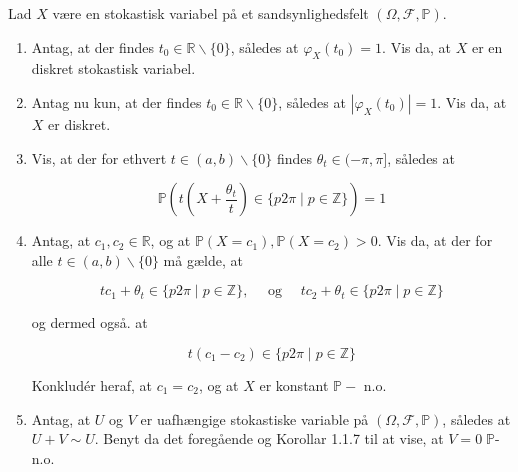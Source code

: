 \documentclass{Class}
\newcommand{\1}{\mathbbm{1}}
\theoremstyle{boxed}
\begin{document}
Lad $X$ være en stokastisk variabel på et sandsynlighedsfelt $(\Omega, \mathcal{F}, \mathbb{P})$.
\begin{enumerate}
  \item Antag, at der findes $t_0 \in \mathbb{R} \backslash\{0\}$, således at $\varphi_X\left(t_0\right)=1$. Vis da, at $X$ er en diskret stokastisk variabel.
  \item  Antag nu kun, at der findes $t_0 \in \mathbb{R} \backslash\{0\}$, således at $\left|\varphi_X\left(t_0\right)\right|=1$. Vis da, at $X$ er diskret.
  \item Vis, at der for ethvert $t \in(a, b) \backslash\{0\}$ findes $\theta_t \in(-\pi, \pi]$, således at

  $$
  \mathbb{P}\left(t\left(X+\frac{\theta_t}{t}\right) \in\{p 2 \pi \mid p \in \mathbb{Z}\}\right)=1
  $$
  \item Antag, at $c_1, c_2 \in \mathbb{R}$, og at $\mathbb{P}\left(X=c_1\right), \mathbb{P}\left(X=c_2\right)>0$. Vis da, at der for alle $t \in(a, b) \backslash\{0\}$ må gælde, at

  $$
  t c_1+\theta_t \in\{p 2 \pi \mid p \in \mathbb{Z}\}, \quad \text { og } \quad t c_2+\theta_t \in\{p 2 \pi \mid p \in \mathbb{Z}\}
  $$
  
  og dermed også. at
  
  $$
  t\left(c_1-c_2\right) \in\{p 2 \pi \mid p \in \mathbb{Z}\}
  $$
  
  
  Konkludér heraf, at $c_1=c_2$, og at $X$ er konstant $\mathbb{P}-$ n.o.
  \item Antag, at $U$ og $V$ er uafhængige stokastiske variable på $(\Omega, \mathcal{F}, \mathbb{P})$, således at $U+V \sim U$. Benyt da det foregående og Korollar 1.1.7 til at vise, at $V=0 \;\mathbb{P}$-n.o.
\end{enumerate}
\solution
\end{document}

